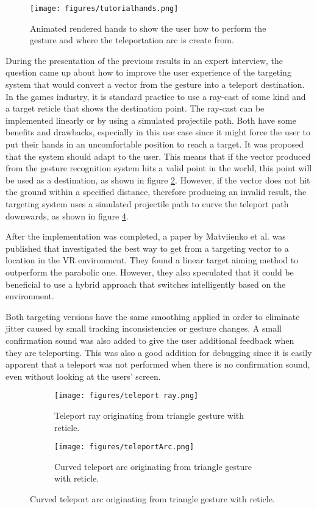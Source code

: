 \begin{figure}[!ht]
    \centering
    \texttt{[image: figures/tutorialhands.png]}
    \caption{Animated rendered hands to show the user how to perform the gesture and where the teleportation arc is create from.}
    \label{fig:tutorial}
\end{figure}

During the presentation of the previous results in an expert interview, the question came up about how to improve the user experience of the targeting system that would convert a vector from the gesture into a teleport destination. In the games industry, it is standard practice to use a ray-cast of some kind and a target reticle that shows the destination point. The ray-cast can be implemented linearly or by using a simulated projectile path. Both have some benefits and drawbacks, especially in this use case since it might force the user to put their hands in an uncomfortable position to reach a target. It was proposed that the system should adapt to the user. This means that if the vector produced from the gesture recognition system hits a valid point in the world, this point will be used as a destination, as shown in figure \ref{fig:tpray}. However, if the vector does not hit the ground within a specified distance, therefore producing an invalid result, the targeting system uses a simulated projectile path to curve the teleport path downwards, as shown in figure \ref{fig:tparc}.

After the implementation was completed, a paper by Matviienko et al. \cite{Andrii2022} was published that investigated the best way to get from a targeting vector to a location in the VR environment. They found a linear target aiming method to outperform the parabolic one. However, they also speculated that it could be beneficial to use a hybrid approach that switches intelligently based on the environment. 

Both targeting versions have the same smoothing applied in order to eliminate jitter caused by small tracking inconsistencies or gesture changes. A small confirmation sound was also added to give the user additional feedback when they are teleporting. This was also a good addition for debugging since it is easily apparent that a teleport was not performed when there is no confirmation sound, even without looking at the users' screen. 

\begin{figure}[!htb]
    \begin{subfigure}{0.5\textwidth}
  \centering
        \texttt{[image: figures/teleport ray.png]}
        \caption{Teleport ray originating from triangle gesture with reticle.}
        \label{fig:tpray}
    \end{subfigure}%
    \begin{subfigure}{0.5\textwidth}
  \centering
        \texttt{[image: figures/teleportArc.png]}
        \caption{Curved teleport arc originating from triangle gesture with reticle.}
        \label{fig:tparc}
    \end{subfigure}%
\end{figure}